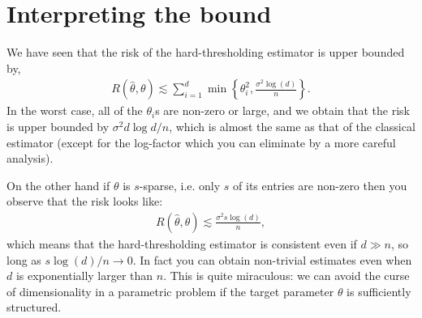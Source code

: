\documentclass[twoside,12pt]{article}
\begin{document}
\section{Interpreting the bound}
We have seen that the risk of the hard-thresholding estimator is upper bounded by, 
\begin{align*}
R(\widehat{\theta},\theta) \lesssim \sum_{i=1}^d \min\left\{\theta_i^2, \frac{\sigma^2 \log(d)}{n} \right\}.
\end{align*}
In the worst case, all of the $\theta_i$s are non-zero or large, and we obtain that the risk is upper bounded by $\sigma^2 d \log d/n$, which is almost the same as that of the classical estimator (except for the log-factor which you can eliminate by a more careful analysis).

On the other hand if $\theta$ is $s$-sparse, i.e. only $s$ of its entries are non-zero then you observe that the risk looks like:
\begin{align*}
R(\widehat{\theta},\theta) \lesssim \frac{\sigma^2 s \log(d)}{n},
\end{align*}
which means that the hard-thresholding estimator is consistent even if $d \gg n$, so long as $s \log(d)/n \rightarrow 0$. In fact you can obtain non-trivial estimates even when $d$ is exponentially larger than $n$. This is quite miraculous: we can avoid the curse of dimensionality in a parametric problem if the target parameter $\theta$ is sufficiently structured.
\end{document}
